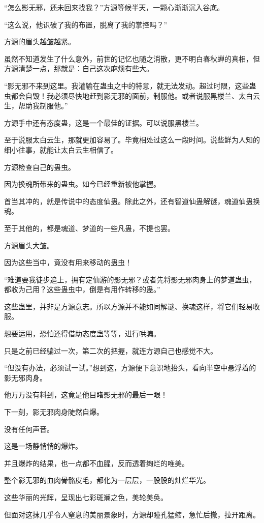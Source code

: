\begin{this_body}
“怎么影无邪，还未回来找我？”方源等候半天，一颗心渐渐沉入谷底。

“这么说，他识破了我的布置，脱离了我的掌控吗？”

方源的眉头越皱越紧。

虽然不知道发生了什么意外，前世的记忆也随之消散，更不明白春秋蝉的真相，但方源清楚一点，那就是：自己这次麻烦有些大。

“影无邪不来到这里。我灌输在蛊虫之中的特意，就无法发动。超过时限，这些蛊虫都会自毁！我必须尽快地赶到影无邪的面前，制服他。或者说服黑楼兰、太白云生，帮助我制服他。”

方源手中还有态度蛊，这是一个最佳的证据。可以说服黑楼兰。

至于说服太白云生，那就更加容易了。毕竟相处过这么一段时间。说些鲜为人知的细小往事，就能让太白云生相信了。

方源检查自己的蛊虫。

因为换魂所带来的蛊虫。如今已经重新被他掌握。

首当其冲的，就是传说中的态度仙蛊。除此之外，还有智道仙蛊解谜，魂道仙蛊换魂。

至于其他的，都是魂道、梦道的一些凡蛊，不提也罢。

方源眉头大皱。

因为这些当中，竟没有用来移动的蛊虫！

“难道要我徒步追上，拥有定仙游的影无邪？或者先将影无邪肉身上的梦道蛊虫，都收为己用？这些蛊虫中，倒是有用作转移的蛊。”

这些蛊里，并非是方源意志。所以方源并不能如同解谜、换魂这样，将它们轻易收服。

想要运用，恐怕还得借助态度蛊等等，进行哄骗。

只是之前已经骗过一次，第二次的把握，就连方源自己也感觉不大。

“但没有办法，必须试一试。”想到这，方源便下意识地抬头，看向半空中悬浮着的影无邪肉身。

他万万没有料到，这竟是他目睹影无邪的最后一眼！

下一刻，影无邪肉身陡然自爆。

没有任何声音。

这是一场静悄悄的爆炸。

并且爆炸的结果，也一点都不血腥，反而透着绚烂的唯美。

整个影无邪的血肉骨骼皮毛，都化为一层层，一股股的灿烂华光。

这些华丽的光辉，呈现出七彩斑斓之色，美轮美奂。

但面对这抹几乎令人窒息的美丽景象时，方源却瞳孔猛缩，急忙后撤，拉开距离。


\end{this_body}
